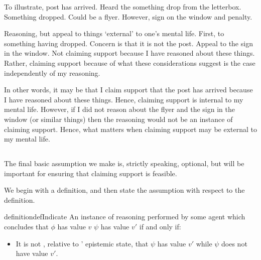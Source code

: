 \begin{note}[Illustration of I/E]
  \color{red}
  To illustrate, post has arrived.
  Heard the something drop from the letterbox.
  Something dropped.
  Could be a flyer.
  However, sign on the window and penalty.

  Reasoning, but appeal to things `external' to one's mental life.
  First, to something having dropped.
  Concern is that it is not the post.
  Appeal to the sign in the window.
  Not claiming support because I have reasoned about these things.
  Rather, claiming support because of what these considerations suggest is the case independently of my reasoning.

  In other words, it may be that I claim support that the post has arrived because I have reasoned about these things.
  Hence, claiming support is internal to my mental life.
  However, if I did not reason about the flyer and the sign in the window (or similar things) then the reasoning would not be an instance of claiming support.
  Hence, what matters when claiming support may be external to my mental life.
\end{note}

\subsection{}
\label{sec:basic-assumptions:indication}

\begin{note}
  The final basic assumption we make is, strictly speaking, optional, but will be important for ensuring that claiming support is feasible.

  We begin with a definition, and then state the assumption with respect to the definition.
\end{note}

\begin{note}
  \begin{restatable}[\indicateN{2}]{definition}{defIndicate}
    \label{def:indication}
    An instance of reasoning performed by some agent \vAgent{} which concludes that \(\phi\) has value \(v\) \emph{} \(\psi\) has value \(v'\) if and only if:
    \begin{itemize}
    \item It is not \epPAd{}, relative to \vAgent{}' epistemic state, that \(\psi\) has value \(v'\) while \(\psi\) does not have value \(v'\).
    \end{itemize}
    \vspace{-\baselineskip}
  \end{restatable}
\end{note}

